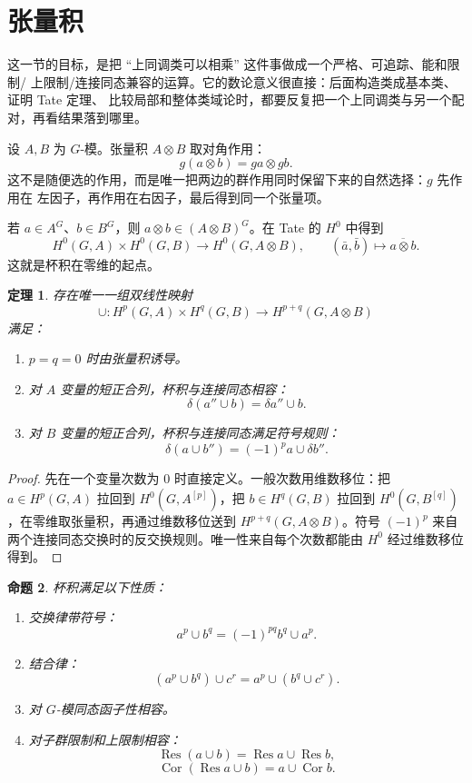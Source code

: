 \documentclass[11pt,a4paper,openany]{ctexbook}
\numberwithin{equation}{chapter}
\theoremstyle{plain}
\newtheorem{theorem}{定理}[chapter]
\newtheorem{proposition}[theorem]{命题}
\theoremstyle{definition}
\theoremstyle{remark}
\begin{document}
\section{张量积}

这一节的目标，是把 ``上同调类可以相乘'' 这件事做成一个严格、可追踪、能和限制/
上限制/连接同态兼容的运算。它的数论意义很直接：后面构造类成基本类、证明 Tate 定理、
比较局部和整体类域论时，都要反复把一个上同调类与另一个配对，再看结果落到哪里。

设 $A,B$ 为 $G$-模。张量积 $A\otimes B$ 取对角作用：
\[
 g(a\otimes b)=ga\otimes gb.
\]
这不是随便选的作用，而是唯一把两边的群作用同时保留下来的自然选择：$g$ 先作用在
左因子，再作用在右因子，最后得到同一个张量项。

若 $a\in A^G$、$b\in B^G$，则 $a\otimes b\in(A\otimes B)^G$。在 Tate 的 $H^0$ 中得到
\[
 H^0(G,A)\times H^0(G,B)\to H^0(G,A\otimes B),
\qquad
 (\bar a,\bar b)\mapsto \overline{a\otimes b}.
\]
这就是杯积在零维的起点。

\begin{theorem}
存在唯一一组双线性映射
\[
 \cup:H^p(G,A)\times H^q(G,B)\to H^{p+q}(G,A\otimes B)
\]
满足：
\begin{enumerate}[label=(\arabic*)]
\item $p=q=0$ 时由张量积诱导。
\item 对 $A$ 变量的短正合列，杯积与连接同态相容：
\[
 \delta(a''\cup b)=\delta a''\cup b.
\]
\item 对 $B$ 变量的短正合列，杯积与连接同态满足符号规则：
\[
 \delta(a\cup b'')=(-1)^p a\cup\delta b''.
\]
\end{enumerate}
\end{theorem}

\begin{proof}
先在一个变量次数为 $0$ 时直接定义。一般次数用维数移位：把 $a\in H^p(G,A)$ 拉回到 $H^0(G,A^{[p]})$，把 $b\in H^q(G,B)$ 拉回到 $H^0(G,B^{[q]})$，在零维取张量积，再通过维数移位送到 $H^{p+q}(G,A\otimes B)$。符号 $(-1)^p$ 来自两个连接同态交换时的反交换规则。唯一性来自每个次数都能由 $H^0$ 经过维数移位得到。
\end{proof}

\begin{proposition}
杯积满足以下性质：
\begin{enumerate}[label=(\arabic*)]
\item 交换律带符号：
\[
 a^p\cup b^q=(-1)^{pq}b^q\cup a^p.
\]
\item 结合律：
\[
 (a^p\cup b^q)\cup c^r=a^p\cup(b^q\cup c^r).
\]
\item 对 $G$-模同态函子性相容。
\item 对子群限制和上限制相容：
\[
 \operatorname{Res}(a\cup b)=\operatorname{Res}a\cup\operatorname{Res}b,
\]
\[
 \operatorname{Cor}(\operatorname{Res}a\cup b)=a\cup\operatorname{Cor}b.
\]
\end{enumerate}
\end{proposition}
\end{document}
